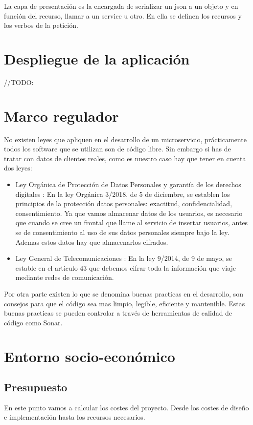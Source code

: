 \documentclass[12pt]{report} %
\begin{document}
 La capa de presentación es la encargada de serializar un json a un objeto y en función del recurso, llamar a un service u otro. En ella se definen los recursos y los verbos de la petición. 
 
\chapter{Despliegue de la aplicación} 
 //TODO:
 
\chapter{Marco regulador}

No existen leyes que apliquen en el desarrollo de un microservicio, prácticamente todos los software que se utilizan son de código libre. Sin embargo si has de tratar con datos de clientes reales, como es nuestro caso hay que tener en cuenta dos leyes:
\begin{itemize}
	\item Ley Orgánica de Protección de Datos Personales y garantía de los derechos digitales \cite{LeyProteccion}: En la ley Orgánica 3/2018, de 5 de diciembre, se establen los principios de la protección datos personales: exactitud, confidencialidad, consentimiento.  Ya que vamos almacenar datos de los usuarios, es necesario que cuando se cree un frontal que llame al servicio de insertar usuarios, antes se de consentimiento al uso de sus datos personales siempre bajo la ley. Ademas estos datos hay que almacenarlos cifrados.
	\item Ley General de Telecomunicaciones \cite{LeyComunicaciones}: En la ley 9/2014, de 9 de mayo, se estable en el articulo 43 que debemos cifrar toda la información que viaje mediante redes de comunicación. 
\end{itemize}

Por otra parte existen lo que se denomina buenas practicas en el desarrollo, son consejos para que el código sea mas limpio, legible, eficiente y mantenible. Estas buenas practicas se pueden controlar a través de herramientas de calidad de código como Sonar.

\chapter{Entorno socio-económico}	

\section{Presupuesto}
En este punto vamos a calcular los costes del proyecto. Desde los costes de diseño e implementación hasta los recursos necesarios.
\end{document}

